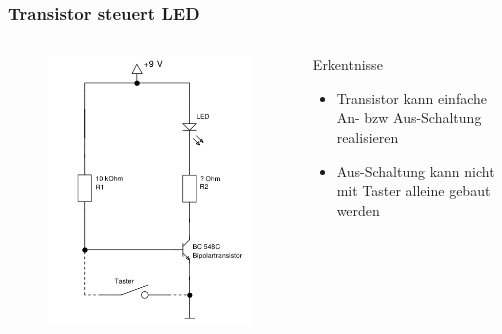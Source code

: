 \begin{frame}
    \frametitle{Transistor steuert LED}
    \begin{columns}[c]
        \begin{figure}[H]
        \begin{center}
                \includegraphics[scale=0.35]{./img/schaltungen/transistorLED_2.png}
        \end{center}
        \end{figure}
    \begin{block}{Erkentnisse}
    \begin{itemize}
        \item Transistor kann einfache An- bzw Aus-Schaltung realisieren
        \item Aus-Schaltung kann nicht mit Taster alleine gebaut werden
    \end{itemize}
    \end{block}
    \end{columns}
\end{frame}

